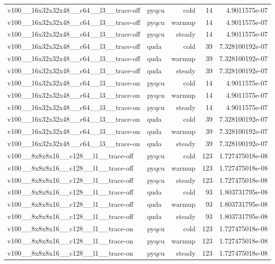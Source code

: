 \begin{table}[htbp]
\begin{tabular}{@{}llrrr@{}}
v100\_\_16x32x32x48\_\_c64\_\_l3\_\_trace-off & pyqcu & cold & 14 & 4.9011575e-07 \\
v100\_\_16x32x32x48\_\_c64\_\_l3\_\_trace-off & pyqcu & warmup & 14 & 4.9011575e-07 \\
v100\_\_16x32x32x48\_\_c64\_\_l3\_\_trace-off & pyqcu & steady & 14 & 4.9011575e-07 \\
v100\_\_16x32x32x48\_\_c64\_\_l3\_\_trace-off & quda & cold & 39 & 7.328100192e-07 \\
v100\_\_16x32x32x48\_\_c64\_\_l3\_\_trace-off & quda & warmup & 39 & 7.328100192e-07 \\
v100\_\_16x32x32x48\_\_c64\_\_l3\_\_trace-off & quda & steady & 39 & 7.328100192e-07 \\
v100\_\_16x32x32x48\_\_c64\_\_l3\_\_trace-on & pyqcu & cold & 14 & 4.9011575e-07 \\
v100\_\_16x32x32x48\_\_c64\_\_l3\_\_trace-on & pyqcu & warmup & 14 & 4.9011575e-07 \\
v100\_\_16x32x32x48\_\_c64\_\_l3\_\_trace-on & pyqcu & steady & 14 & 4.9011575e-07 \\
v100\_\_16x32x32x48\_\_c64\_\_l3\_\_trace-on & quda & cold & 39 & 7.328100192e-07 \\
v100\_\_16x32x32x48\_\_c64\_\_l3\_\_trace-on & quda & warmup & 39 & 7.328100192e-07 \\
v100\_\_16x32x32x48\_\_c64\_\_l3\_\_trace-on & quda & steady & 39 & 7.328100192e-07 \\
v100\_\_8x8x8x16\_\_c128\_\_l1\_\_trace-off & pyqcu & cold & 123 & 1.727475018e-08 \\
v100\_\_8x8x8x16\_\_c128\_\_l1\_\_trace-off & pyqcu & warmup & 123 & 1.727475018e-08 \\
v100\_\_8x8x8x16\_\_c128\_\_l1\_\_trace-off & pyqcu & steady & 123 & 1.727475018e-08 \\
v100\_\_8x8x8x16\_\_c128\_\_l1\_\_trace-off & quda & cold & 93 & 1.803731795e-08 \\
v100\_\_8x8x8x16\_\_c128\_\_l1\_\_trace-off & quda & warmup & 93 & 1.803731795e-08 \\
v100\_\_8x8x8x16\_\_c128\_\_l1\_\_trace-off & quda & steady & 93 & 1.803731795e-08 \\
v100\_\_8x8x8x16\_\_c128\_\_l1\_\_trace-on & pyqcu & cold & 123 & 1.727475018e-08 \\
v100\_\_8x8x8x16\_\_c128\_\_l1\_\_trace-on & pyqcu & warmup & 123 & 1.727475018e-08 \\
v100\_\_8x8x8x16\_\_c128\_\_l1\_\_trace-on & pyqcu & steady & 123 & 1.727475018e-08 \\

\end{tabular}
\end{table}
